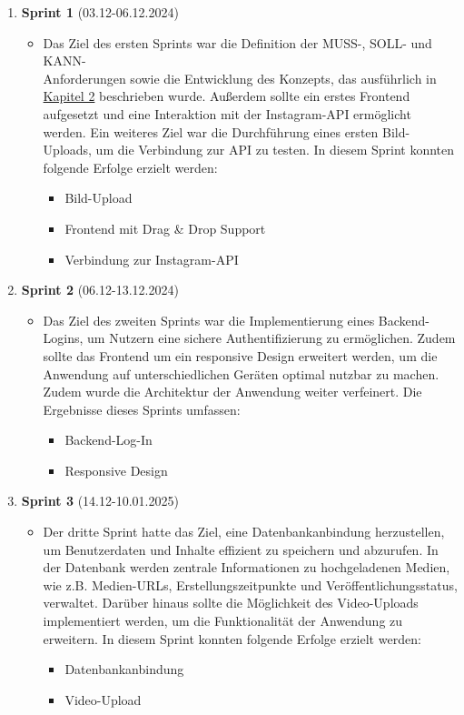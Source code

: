 \begin{enumerate}
    \item \textbf{Sprint 1} (03.12-06.12.2024)
    \begin{itemize}
        \item Das Ziel des ersten Sprints war die Definition der MUSS-, SOLL- und KANN-\\Anforderungen sowie die Entwicklung des Konzepts, das ausführlich in \hyperref[sec:chapter2]{Kapitel 2} beschrieben wurde. Außerdem sollte 
        ein erstes Frontend aufgesetzt und eine Interaktion mit der Instagram-\ac{API} ermöglicht werden. Ein weiteres Ziel war die Durchführung eines ersten Bild-Uploads, um die Verbindung zur \ac{API} zu testen.
        In diesem Sprint konnten folgende Erfolge erzielt werden:
        \begin{itemize}
            \item Bild-Upload 
            \item Frontend mit Drag \& Drop Support
            \item Verbindung zur Instagram-\ac{API}
        \end{itemize}
    \end{itemize}

    \item \textbf{Sprint 2} (06.12-13.12.2024)
    \begin{itemize}
        \item Das Ziel des zweiten Sprints war die Implementierung eines Backend-Logins, um Nutzern eine sichere Authentifizierung zu ermöglichen. Zudem sollte das Frontend um ein responsive Design erweitert werden, um die Anwendung 
        auf unterschiedlichen Geräten optimal nutzbar zu machen. Zudem wurde die Architektur der Anwendung weiter verfeinert. Die Ergebnisse dieses Sprints umfassen:
        \begin{itemize}
            \item Backend-Log-In
            \item Responsive Design
        \end{itemize}
    \end{itemize}

    \item \textbf{Sprint 3} (14.12-10.01.2025) 
    \begin{itemize}
        \item Der dritte Sprint hatte das Ziel, eine Datenbankanbindung herzustellen, um Benutzerdaten und Inhalte effizient zu speichern und abzurufen. In der Datenbank werden zentrale Informationen zu hochgeladenen Medien, 
        wie z.B. Medien-URLs, Erstellungszeitpunkte und Veröffentlichungsstatus, verwaltet. Darüber hinaus sollte die Möglichkeit des Video-Uploads implementiert werden, um die Funktionalität der Anwendung zu erweitern. 
        In diesem Sprint konnten folgende Erfolge erzielt werden:
        \begin{itemize}
            \item Datenbankanbindung
            \item Video-Upload
        \end{itemize}
    \end{itemize}


\end{enumerate}
